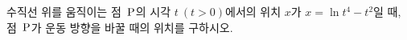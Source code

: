 수직선 위를 움직이는 점~$\mathrm{P}$의 시각 $t\ (t>0)$에서의 위치 $x$가 $x=\ln t^4-t^2$일 때, 점~$\mathrm{P}$가 운동 방향을 바꿀 때의 위치를 구하시오.
